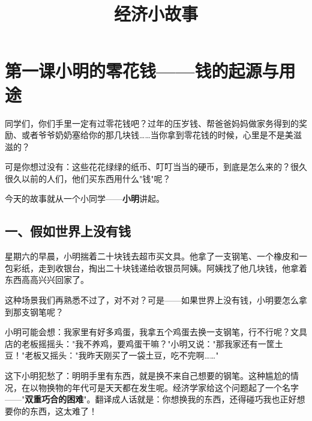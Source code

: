 \documentclass[a4paper,12pt]{ctexart}
\title{\textcolor{blue!70!black}{\Huge\textbf{经济小故事}}}
\author{}
\date{}
\begin{document}
\maketitle
\thispagestyle{empty}

\tableofcontents
\newpage

\section{\textcolor{orange!80!black}{第一课\quad 小明的零花钱——钱的起源与用途}}

同学们，你们手里一定有过零花钱吧？过年的压岁钱、帮爸爸妈妈做家务得到的奖励、或者爷爷奶奶塞给你的那几块钱……当你拿到零花钱的时候，心里是不是美滋滋的？

可是你想过没有：这些花花绿绿的纸币、叮叮当当的硬币，到底是怎么来的？很久很久以前的人们，他们买东西用什么"钱"呢？

今天的故事就从一个小同学——\textbf{小明}讲起。

\subsection*{一、假如世界上没有钱}

星期六的早晨，小明揣着二十块钱去超市买文具。他拿了一支钢笔、一个橡皮和一包彩纸，走到收银台，掏出二十块钱递给收银员阿姨。阿姨找了他几块钱，他拿着东西高高兴兴回家了。

这种场景我们再熟悉不过了，对不对？可是——如果世界上没有钱，小明要怎么拿到那支钢笔呢？

小明可能会想：我家里有好多鸡蛋，我拿五个鸡蛋去换一支钢笔，行不行呢？文具店的老板摇摇头："我不养鸡，要鸡蛋干嘛？"小明又说："那我家还有一筐土豆！"老板又摇头："我昨天刚买了一袋土豆，吃不完啊……"

这下小明犯愁了：明明手里有东西，就是换不来自己想要的钢笔。这种尴尬的情况，在以物换物的年代可是天天都在发生呢。经济学家给这个问题起了一个名字——"\textbf{双重巧合的困难}"。翻译成人话就是：你想换我的东西，还得碰巧我也正好想要你的东西，这太难了！

\begin{center}
\end{center}
\end{document}
